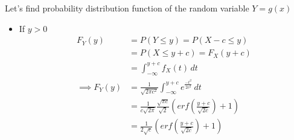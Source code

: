 \documentclass{beamer}
\begin{document}
\begin{frame}{}
Let's find probability distribution function of the random variable $Y=g(x)$
 
\begin{itemize}
    \item If $y > 0$
    \begin{align}
        F_Y(y)&=P(Y\leq y)=P(X-c \leq y)\\
            &=P(X \leq y+c)=F_X(y+c)\\
            &=\int_{-\infty}^{y+c} f_X(t) \, dt \\
            \implies F_Y(y)&=\frac{1}{\sqrt{2\pi c^2}}\int_{-\infty}^{y+c}e^{\frac{-t^2}{2c^2}}\, dt\\
            &=\frac{1}{c\sqrt{2\pi}}\frac{\sqrt{\pi c}}{\sqrt{2}} \left(erf\left(\frac{y+c}{\sqrt{2c}}\right)+1\right)\\
            &=\frac{1}{2\sqrt{c}}\left(erf\left(\frac{y+c}{\sqrt{2c}}\right)+1\right)
    \end{align}
\end{itemize}
\end{frame}
\end{document}
